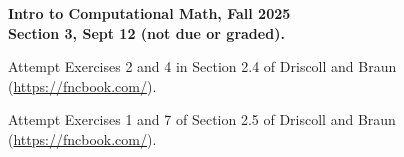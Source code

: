 \documentclass[11pt]{article}
\begin{document}
\begin{center}
{\bf Intro to Computational Math, Fall 2025\\
Section 3, Sept 12 (not due or graded).\\
}
\end{center}


 Attempt Exercises 2 and 4 in Section 2.4 of Driscoll and Braun (\url{https://fncbook.com/}).

\vskip1cm

 Attempt Exercises 1 and 7 of Section 2.5 of Driscoll and Braun (\url{https://fncbook.com/}).
\end{document}
